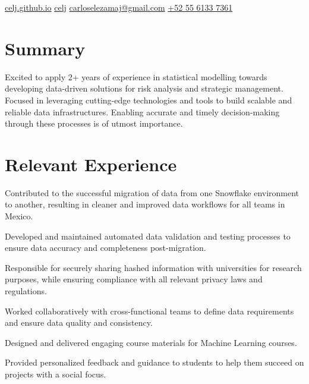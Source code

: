 \documentclass[]{resume}
\begin{document}

{\contactline
{\href{https://celj.github.io}{celj.github.io}}
{\href{https://www.github.com/celj}{celj}}
{\href{mailto:carloselezamaj@gmail.com}{carloselezamaj@gmail.com}}
{\href{tel:+525561337361}{+52 55 6133 7361}}
}


\begin{minipage}[t]{0.70\textwidth}


\section{Summary}

Excited to apply 2+ years of experience in statistical modelling towards developing data-driven solutions for risk analysis and strategic management. Focused in leveraging cutting-edge technologies and tools to build scalable and reliable data infrastructures. Enabling accurate and timely decision-making through these processes is of utmost importance.


\section{Relevant Experience}

\vspace{\topsep}
\begin{tightemize}
\sectionsep
\sectionsep
\item Contributed to the successful migration of data from one Snowflake environment to another, resulting in cleaner and improved data workflows for all teams in Mexico.
\item Developed and maintained automated data validation and testing processes to ensure data accuracy and completeness post-migration.
\item Responsible for securely sharing hashed information with universities for research purposes, while ensuring compliance with all relevant privacy laws and regulations.
\item Worked collaboratively with cross-functional teams to define data requirements and ensure data quality and consistency.
\end{tightemize}
\sectionsep

\begin{tightemize}
\sectionsep
\item Designed and delivered engaging course materials for Machine Learning courses.
\item Provided personalized feedback and guidance to students to help them succeed on projects with a social focus.
\end{tightemize}
\sectionsep


\end{minipage}
\end{document}
